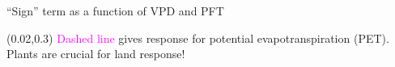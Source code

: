 \documentclass[aspectratio=169]{beamer}
\begin{document}
\begin{frame}{``Sign'' term as a function of VPD and PFT}
  \begin{figure}
\end{figure}
\begin{textblock*}{0.25\textwidth}(0.02\textwidth,0.3\textheight)
  \textcolor{magenta}{Dashed line} gives response for potential evapotranspiration (PET).\\
\medskip
  Plants are crucial for land response!
\end{textblock*}
\end{frame}
\end{document}
